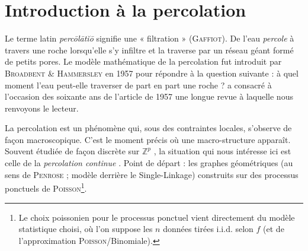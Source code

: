 

\section{Introduction à la percolation}

Le terme latin \emph{percōlātĭō} signifie une « filtration » (\textsc{Gaffiot}). De l'eau \emph{percole} à travers une roche lorsqu'elle s'y infiltre et la traverse par un réseau géant formé de petits pores. Le modèle mathématique de la percolation fut introduit par \textsc{Broadbent \& Hammersley} \cite{BroadbentHammersley1957} en 1957 pour répondre à la question suivante : à quel moment l'eau peut-elle traverser de part en part une roche ?  \cite{SoixanteAnsPercolation} a consacré à l'occasion des soixante ans de l'article de 1957 une longue revue à laquelle nous renvoyons le lecteur.

La percolation est un phénomène qui, sous des contraintes locales, s'observe de façon macroscopique. C'est le moment précis où une macro-structure apparaît. Souvent étudiée de façon discrète sur $\mathbb Z^p$ \cite{Grimmett1999, Percolation2006}, la situation qui nous intéresse ici est celle de la \emph{percolation continue} \cite{MeesterRoy, penrose2003}. Point de départ : les graphes géométriques (au sens de \textsc{Penrose} \cite{Penrose1995, penrose2003} ; modèle derrière le Single-Linkage) construits sur des processus ponctuels de \textsc{Poisson}\footnote{Le choix poissonien pour le processus ponctuel vient directement du modèle statistique choisi, où l'on suppose les $n$ données tirées i.i.d. selon $f$ (et de l'approximation \textsc{Poisson}/Binomiale).}.

